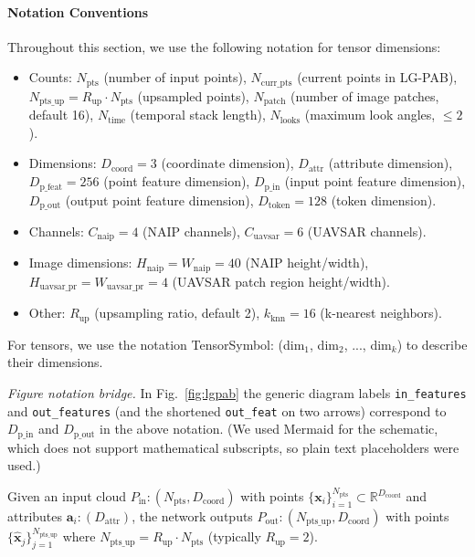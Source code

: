 \documentclass[remotesensing,article,submit,pdftex,moreauthors]{Definitions/mdpi}
\begin{document}
\paragraph{Notation Conventions}
Throughout this section, we use the following notation for tensor dimensions:
\begin{itemize}
    \item Counts: $N_{\text{pts}}$ (number of input points), $N_{\text{curr\_pts}}$ (current points in LG-PAB), $N_{\text{pts\_up}} = R_{\text{up}} \cdot N_{\text{pts}}$ (upsampled points), $N_{\text{patch}}$ (number of image patches, default 16), $N_{\text{time}}$ (temporal stack length), $N_{\text{looks}}$ (maximum look angles, $\leq 2$).
    \item Dimensions: $D_{\text{coord}} = 3$ (coordinate dimension), $D_{\text{attr}}$ (attribute dimension), $D_{\text{p\_feat}} = 256$ (point feature dimension), $D_{\text{p\_in}}$ (input point feature dimension), $D_{\text{p\_out}}$ (output point feature dimension), $D_{\text{token}} = 128$ (token dimension).
    \item Channels: $C_{\text{naip}} = 4$ (NAIP channels), $C_{\text{uavsar}} = 6$ (UAVSAR channels).
    \item Image dimensions: $H_{\text{naip}} = W_{\text{naip}} = 40$ (NAIP height/width), $H_{\text{uavsar\_pr}} = W_{\text{uavsar\_pr}} = 4$ (UAVSAR patch region height/width).
    \item Other: $R_{\text{up}}$ (upsampling ratio, default 2), $k_{\text{knn}} = 16$ (k-nearest neighbors).
\end{itemize}
For tensors, we use the notation TensorSymbol: (dim$_1$, dim$_2$, ..., dim$_k$) to describe their dimensions.

\noindent\textit{Figure notation bridge.} In Fig.~\ref{fig:lgpab} the generic diagram labels \texttt{in\_features} and \texttt{out\_features} (and the shortened \texttt{out\_feat} on two arrows) correspond to $D_{\text{p\_in}}$ and $D_{\text{p\_out}}$ in the above notation. (We used Mermaid for the schematic, which does not support mathematical subscripts, so plain text placeholders were used.)

Given an input cloud $P_{\text{in}}: (N_{\text{pts}}, D_{\text{coord}})$ with points $\{\mathbf{x}_i\}_{i=1}^{N_{\text{pts}}}\subset\mathbb{R}^{D_{\text{coord}}}$ and attributes $\mathbf{a}_i: (D_{\text{attr}})$, the network outputs $P_{\text{out}}: (N_{\text{pts\_up}}, D_{\text{coord}})$ with points $\{\hat{\mathbf{x}}_j\}_{j=1}^{N_{\text{pts\_up}}}$ where $N_{\text{pts\_up}} = R_{\text{up}} \cdot N_{\text{pts}}$ (typically $R_{\text{up}} = 2$).
\end{document}
